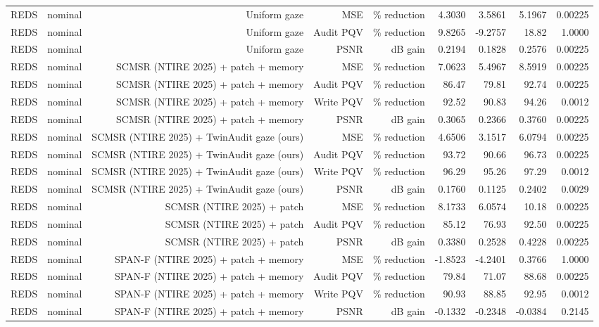 \begin{table}[t]
\begin{tabular}{llrrrrrrr}
REDS & nominal & Uniform gaze & MSE & \% reduction & 4.3030 & 3.5861 & 5.1967 & 0.00225 \\
REDS & nominal & Uniform gaze & Audit PQV & \% reduction & 9.8265 & -9.2757 & 18.82 & 1.0000 \\
REDS & nominal & Uniform gaze & PSNR & dB gain & 0.2194 & 0.1828 & 0.2576 & 0.00225 \\
REDS & nominal & SCMSR (NTIRE 2025) + patch + memory & MSE & \% reduction & 7.0623 & 5.4967 & 8.5919 & 0.00225 \\
REDS & nominal & SCMSR (NTIRE 2025) + patch + memory & Audit PQV & \% reduction & 86.47 & 79.81 & 92.74 & 0.00225 \\
REDS & nominal & SCMSR (NTIRE 2025) + patch + memory & Write PQV & \% reduction & 92.52 & 90.83 & 94.26 & 0.0012 \\
REDS & nominal & SCMSR (NTIRE 2025) + patch + memory & PSNR & dB gain & 0.3065 & 0.2366 & 0.3760 & 0.00225 \\
REDS & nominal & SCMSR (NTIRE 2025) + TwinAudit gaze (ours) & MSE & \% reduction & 4.6506 & 3.1517 & 6.0794 & 0.00225 \\
REDS & nominal & SCMSR (NTIRE 2025) + TwinAudit gaze (ours) & Audit PQV & \% reduction & 93.72 & 90.66 & 96.73 & 0.00225 \\
REDS & nominal & SCMSR (NTIRE 2025) + TwinAudit gaze (ours) & Write PQV & \% reduction & 96.29 & 95.26 & 97.29 & 0.0012 \\
REDS & nominal & SCMSR (NTIRE 2025) + TwinAudit gaze (ours) & PSNR & dB gain & 0.1760 & 0.1125 & 0.2402 & 0.0029 \\
REDS & nominal & SCMSR (NTIRE 2025) + patch & MSE & \% reduction & 8.1733 & 6.0574 & 10.18 & 0.00225 \\
REDS & nominal & SCMSR (NTIRE 2025) + patch & Audit PQV & \% reduction & 85.12 & 76.93 & 92.50 & 0.00225 \\
REDS & nominal & SCMSR (NTIRE 2025) + patch & PSNR & dB gain & 0.3380 & 0.2528 & 0.4228 & 0.00225 \\
REDS & nominal & SPAN-F (NTIRE 2025) + patch + memory & MSE & \% reduction & -1.8523 & -4.2401 & 0.3766 & 1.0000 \\
REDS & nominal & SPAN-F (NTIRE 2025) + patch + memory & Audit PQV & \% reduction & 79.84 & 71.07 & 88.68 & 0.00225 \\
REDS & nominal & SPAN-F (NTIRE 2025) + patch + memory & Write PQV & \% reduction & 90.93 & 88.85 & 92.95 & 0.0012 \\
REDS & nominal & SPAN-F (NTIRE 2025) + patch + memory & PSNR & dB gain & -0.1332 & -0.2348 & -0.0384 & 0.2145 \\

\end{tabular}
\end{table}
